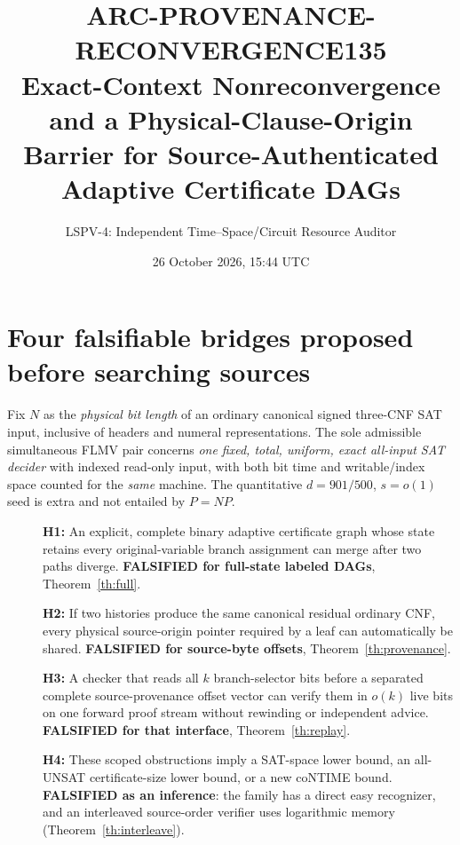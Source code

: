 \documentclass[11pt]{article}
\title{ARC-PROVENANCE-RECONVERGENCE135\\\large Exact-Context Nonreconvergence and a Physical-Clause-Origin Barrier for Source-Authenticated Adaptive Certificate DAGs}
\author{LSPV-4: Independent Time--Space/Circuit Resource Auditor}
\date{26 October 2026, 15:44 UTC}
\begin{document}
\maketitle
\begin{center}\end{center}

\section{Four falsifiable bridges proposed before searching sources}
Fix $N$ as the \emph{physical bit length} of an ordinary canonical signed three-CNF SAT input, inclusive of headers and numeral representations. The sole admissible simultaneous FLMV pair concerns \emph{one fixed, total, uniform, exact all-input SAT decider} with indexed read-only input, with both bit time and writable/index space counted for the \emph{same} machine. The quantitative $d=901/500$, $s=o(1)$ seed is extra and not entailed by $P=NP$.
\begin{description}
\item[] \textbf{H1:} An explicit, complete binary adaptive certificate graph whose state retains every original-variable branch assignment can merge after two paths diverge. \textbf{FALSIFIED for full-state labeled DAGs}, Theorem~\ref{th:full}.
\item[] \textbf{H2:} If two histories produce the same canonical residual ordinary CNF, every physical source-origin pointer required by a leaf can automatically be shared. \textbf{FALSIFIED for source-byte offsets}, Theorem~\ref{th:provenance}.
\item[] \textbf{H3:} A checker that reads all $k$ branch-selector bits before a separated complete source-provenance offset vector can verify them in $o(k)$ live bits on one forward proof stream without rewinding or independent advice. \textbf{FALSIFIED for that interface}, Theorem~\ref{th:replay}.
\item[] \textbf{H4:} These scoped obstructions imply a SAT-space lower bound, an all-UNSAT certificate-size lower bound, or a new coNTIME bound. \textbf{FALSIFIED as an inference}: the family has a direct easy recognizer, and an interleaved source-order verifier uses logarithmic memory (Theorem~\ref{th:interleave}).
\end{description}
\end{document}
